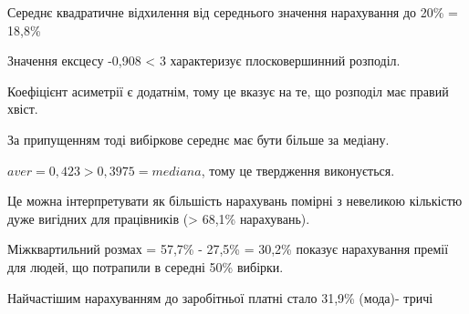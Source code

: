\documentclass[14pt]{extarticle}
\begin{document}
Середнє квадратичне відхилення від середнього значення нарахування до 20\% = 18,8\%

Значення ексцесу -0,908 < 3  характеризує плосковершинний розподіл.

Коефіцієнт асиметрії є додатнім, тому це вказує на те, що розподіл має  правий хвіст. 

За припущенням тоді вибіркове середнє має бути більше за медіану.

$ aver = 0,423 >  0,3975 = mediana $, тому це твердження виконується.

 Це можна інтерпретувати як більшість нарахувань помірні з невеликою кількістю дуже вигідних для працівників (> 68,1\% нарахувань). 

Міжквартильний розмах = 57,7\% - 27,5\% = 30,2\% показує нарахування премії для людей, що потрапили в середні 50\% вибірки.

Найчастішим нарахуванням до заробітньої платні стало 31,9\% (мода)- тричі
\end{document}
